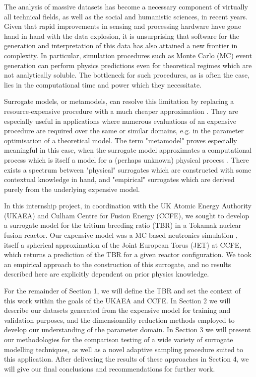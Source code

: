 The analysis of massive datasets has become a necessary component of virtually all technical fields, as well as the social and humanistic sciences, in recent years. Given that rapid improvements in sensing and processing hardware have gone hand in hand with the data explosion, it is unsurprising that software for the generation and interpretation of this data has also attained a new frontier in complexity. In particular, simulation procedures such as Monte Carlo (MC) event generation can perform physics predictions even for theoretical regimes which are not analytically soluble. The bottleneck for such procedures, as is often the case, lies in the computational time and power which they necessitate.

Surrogate models, or metamodels, can resolve this limitation by replacing a resource-expensive procedure with a much cheaper approximation \cite{Sondergaard2003}. They are especially useful in applications where numerous evaluations of an expensive procedure are required over the same or similar domains, e.g. in the parameter optimisation of a theoretical model. The term "metamodel" proves especially meaningful in this case, when the surrogate model approximates a computational process which is itself a model for a (perhaps unknown) physical process \cite{Myers2002}. There exists a spectrum between "physical" surrogates which are constructed with some contextual knowledge in hand, and "empirical" surrogates which are derived purely from the underlying expensive model. 

In this internship project, in coordination with the UK Atomic Energy Authority (UKAEA) and Culham Centre for Fusion Energy (CCFE), we sought to develop a surrogate model for the tritium breeding ratio (TBR) in a Tokamak nuclear fusion reactor. Our expensive model was a MC-based neutronics simulation \cite{JonathanCollab}, itself a spherical approximation of the Joint European Torus (JET) at CCFE, which returns a prediction of the TBR for a given reactor configuration. We took an empirical approach to the construction of this surrogate, and no results described here are explicitly dependent on prior physics knowledge.

For the remainder of Section 1, we will define the TBR and set the context of this work within the goals of the UKAEA and CCFE. In Section 2 we will describe our datasets generated from the expensive model for training and validation purposes, and the dimensionality reduction methods employed to develop our understanding of the parameter domain. In Section 3 we will present our methodologies for the comparison testing of a wide variety of surrogate modelling techniques, as well as a novel adaptive sampling procedure suited to this application. After delivering the results of these approaches in Section 4, we will give our final conclusions and recommendations for further work.

